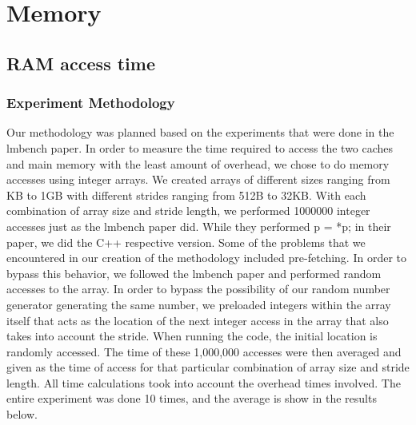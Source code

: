 \documentclass{article} %
\begin{document}

\section{Memory}
\subsection{RAM access time}
\subsubsection{Experiment Methodology}
Our methodology was planned based on the experiments that were done in the lmbench paper. In order to measure the time required to access the two caches and main memory with the least amount of overhead, we chose to do memory accesses using integer arrays. We created arrays of different sizes ranging from KB to 1GB with different strides ranging from 512B to 32KB. With each combination of array size and stride length, we performed 1000000 integer accesses just as the lmbench paper did. While they performed p = *p; in their paper, we did the C++ respective version. Some of the problems that we encountered in our creation of the methodology included pre-fetching. In order to bypass this behavior, we followed the lmbench paper and performed random accesses to the array. In order to bypass the possibility of our random number generator generating the same number, we preloaded integers within the array itself that acts as the location of the next integer access in the array that also takes into account the stride. When running the code, the initial location is randomly accessed. The time of these 1,000,000 accesses were then averaged and given as the time of access for that particular combination of array size and stride length. All time calculations took into account the overhead times involved. The entire experiment was done 10 times, and the average is show in the results below.  
\end{document}
